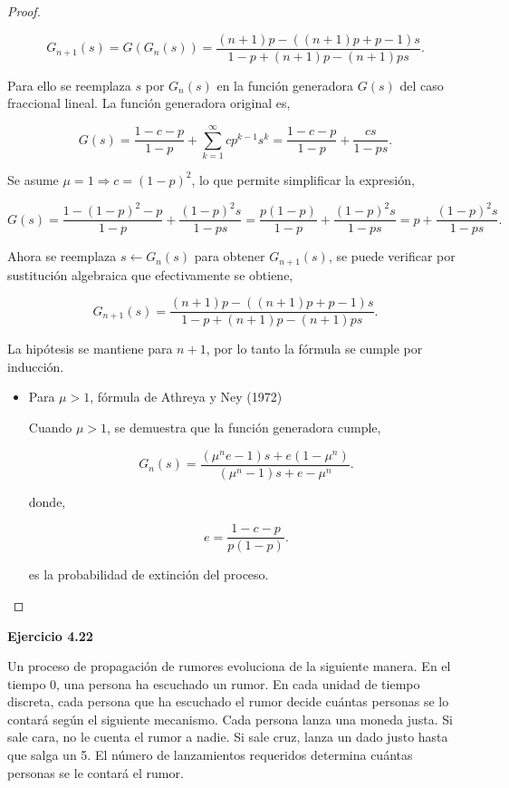 \documentclass{article}
\begin{document}
\begin{proof}
\begin{itemize}
\[
G_{n+1}(s) = G(G_n(s)) = \frac{(n + 1)p - ((n + 1)p + p - 1)s}{1 - p + (n + 1)p - (n + 1)p s}.
\]

Para ello se reemplaza \( s \) por \( G_n(s) \) en la función generadora \( G(s) \) del caso fraccional lineal. La función generadora original es,

\[
G(s) = \frac{1 - c - p}{1 - p} + \sum_{k = 1}^{\infty} c p^{k-1} s^k = \frac{1 - c - p}{1 - p} + \frac{c s}{1 - p s}.
\]

Se asume \( \mu = 1 \Rightarrow c = (1 - p)^2 \), lo que permite simplificar la expresión,

\[
G(s) = \frac{1 - (1 - p)^2 - p}{1 - p} + \frac{(1 - p)^2 s}{1 - p s}
= \frac{p(1 - p)}{1 - p} + \frac{(1 - p)^2 s}{1 - p s}
= p + \frac{(1 - p)^2 s}{1 - p s}.
\]

Ahora se reemplaza \( s \leftarrow G_n(s) \) para obtener \( G_{n+1}(s) \), se puede verificar por sustitución algebraica que efectivamente se obtiene,

\[
G_{n+1}(s) = \frac{(n + 1)p - ((n + 1)p + p - 1)s}{1 - p + (n + 1)p - (n + 1)p s}.
\]

La hipótesis se mantiene para \( n + 1 \), por lo tanto la fórmula se cumple por inducción.
\end{itemize}

\begin{itemize}
\item[(c)] Para \( \mu > 1 \), fórmula de Athreya y Ney (1972)


Cuando \( \mu > 1 \), se demuestra que la función generadora cumple,

\[
G_n(s) = \frac{(\mu^n e - 1)s + e (1 - \mu^n)}{(\mu^n - 1)s + e - \mu^n}.
\]

donde,

\[
e = \frac{1 - c - p}{p(1 - p)}.
\]

es la probabilidad de extinción del proceso.
\end{itemize}
\end{proof}



\textbf{Ejercicio 4.22}

Un proceso de propagación de rumores evoluciona de la siguiente manera. En el tiempo 0, una persona ha escuchado un rumor. En cada unidad de tiempo discreta, cada persona que ha escuchado el rumor decide cuántas personas se lo contará según el siguiente mecanismo. Cada persona lanza una moneda justa. Si sale cara, no le cuenta el rumor a nadie. Si sale cruz, lanza un dado justo hasta que salga un 5. El número de lanzamientos requeridos determina cuántas personas se le contará el rumor.
\end{document}
